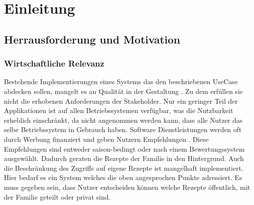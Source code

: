 \chapter{Einleitung}
\label{cha:Einleitung}

\section{Herrausforderung und Motivation}
\subsection{Wirtschaftliche Relevanz}
Bestehende Implementierungen eines Systems das den beschriebenen UseCase abdecken sollen, mangelt es an Qualität in der Gestaltung \citep[vgl. diverse Kommentare]{trustpilot:online}. Zu dem erfüllen sie nicht die erhobenen Anforderungen der Stakeholder. Nur ein geringer Teil der Applikationen ist auf allen Betriebssystemen verfügbar, was die Nutzbarkeit erheblich einschränkt, da nicht angenommen werden kann, dass alle Nutzer das selbe Betriebssystem in Gebrauch haben. Software Dienstleistungen werden oft durch Werbung finanziert und geben Nutzern Empfehlungen \citep[vgl. Punkt 1]{HowDoFre38:online}. Diese Empfehlungen sind entweder saison-bedingt oder nach einem Bewertungssystem ausgewählt. Dadurch geraten die Rezepte der Familie in den Hintergrund\citep{bpb2021fastfood}\citep{bpb2021fastfoodtopic}. Auch die Beschränkung des Zugriffs auf eigene Rezepte ist mangelhaft implementiert. Hier bedarf es ein System welches die oben angesprochen Punkte adressiert. Es muss gegeben sein, dass Nutzer entscheiden können welche Rezepte öffentlich, mit der Familie geteilt oder privat sind.

